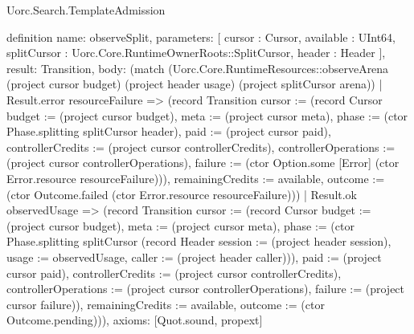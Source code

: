 \begin{lexlean}{Uorc.Search.TemplateAdmission}
\begin{semanticmodule}
definition{
  name: observeSplit,
  parameters: [
    cursor : Cursor,
    available : UInt64,
    splitCursor : Uorc.Core.RuntimeOwnerRoots::SplitCursor,
    header : Header
  ],
  result: Transition,
  body: (match (Uorc.Core.RuntimeResources::observeArena (project cursor budget) (project header usage) (project splitCursor arena))
    | Result.error resourceFailure => (record Transition {cursor := (record Cursor {budget := (project cursor budget), meta := (project cursor meta), phase := (ctor Phase.splitting splitCursor header), paid := (project cursor paid), controllerCredits := (project cursor controllerCredits), controllerOperations := (project cursor controllerOperations), failure := (ctor Option.some [Error] (ctor Error.resource resourceFailure))}), remainingCredits := available, outcome := (ctor Outcome.failed (ctor Error.resource resourceFailure))})
    | Result.ok observedUsage => (record Transition {cursor := (record Cursor {budget := (project cursor budget), meta := (project cursor meta), phase := (ctor Phase.splitting splitCursor (record Header {session := (project header session), usage := observedUsage, caller := (project header caller)})), paid := (project cursor paid), controllerCredits := (project cursor controllerCredits), controllerOperations := (project cursor controllerOperations), failure := (project cursor failure)}), remainingCredits := available, outcome := (ctor Outcome.pending)})),
  axioms: [Quot.sound, propext]
}


\end{semanticmodule}
\end{lexlean}
